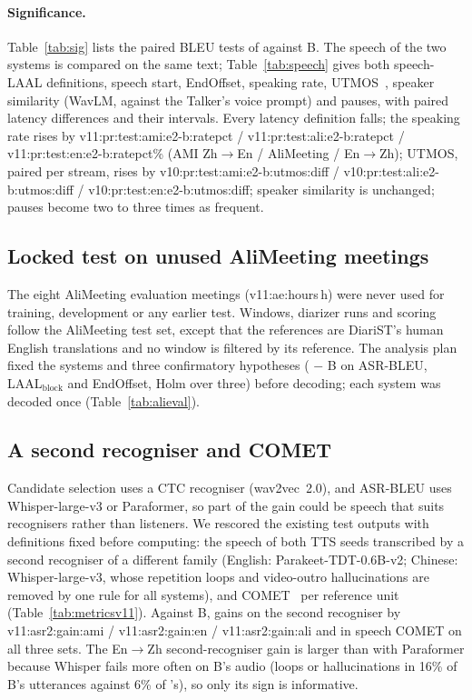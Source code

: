 \paragraph{Significance.} Table~\ref{tab:sig} lists the paired BLEU tests of \sys{} against B. The speech of the two
systems is compared on the same text; Table~\ref{tab:speech} gives both speech-LAAL definitions, speech start,
EndOffset, speaking rate, UTMOS~\citep{saeki2022utmos}, speaker similarity (WavLM, against the Talker's voice prompt)
and pauses, with paired latency differences and their intervals. Every latency definition falls; the speaking rate rises
by \num{v11:pr:test:ami:e2-b:ratepct} / \num{v11:pr:test:ali:e2-b:ratepct} / \num{v11:pr:test:en:e2-b:ratepct}\%
(AMI Zh$\rightarrow$En / AliMeeting / En$\rightarrow$Zh); UTMOS, paired per stream, rises by
\num{v10:pr:test:ami:e2-b:utmos:diff} / \num{v10:pr:test:ali:e2-b:utmos:diff} / \num{v10:pr:test:en:e2-b:utmos:diff};
speaker similarity is unchanged; pauses become two to three times as frequent.




\ifAliEval
\subsection{Locked test on unused AliMeeting meetings}
\label{app:alieval}
The eight AliMeeting evaluation meetings (\num{v11:ae:hours}\,h) were never used for training, development or any
earlier test. Windows, diarizer runs and scoring follow the AliMeeting test set, except that the references are
DiariST's human English translations and no window is filtered by its reference. The analysis plan fixed the systems
and three confirmatory hypotheses (\sys{} $-$ B on ASR-BLEU, LAAL$_\text{block}$ and EndOffset, Holm over three)
before decoding; each system was decoded once (Table~\ref{tab:alieval}).

\fi

\ifMetricsV
\subsection{A second recogniser and COMET}
\label{app:metricsv11}
Candidate selection uses a CTC recogniser (wav2vec~2.0), and ASR-BLEU uses Whisper-large-v3 or Paraformer, so part of
the gain could be speech that suits recognisers rather than listeners. We rescored the existing test outputs with
definitions fixed before computing: the speech of both TTS seeds transcribed by a second recogniser of a different
family (English: Parakeet-TDT-0.6B-v2; Chinese: Whisper-large-v3, whose repetition loops and video-outro hallucinations
are removed by one rule for all systems), and COMET~\citep{rei2022comet} per reference unit (Table~\ref{tab:metricsv11}).
Against B, \sys{} gains on the second recogniser by \num{v11:asr2:gain:ami} / \num{v11:asr2:gain:en} /
\num{v11:asr2:gain:ali} and in speech COMET on all three sets. The En$\rightarrow$Zh second-recogniser gain is larger
than with Paraformer because Whisper fails more often on B's audio (loops or hallucinations in 16\% of B's utterances
against 6\% of \sys{}'s), so only its sign is informative.

\fi

